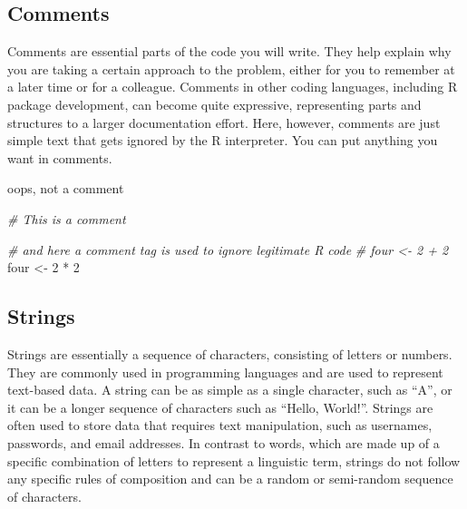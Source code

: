 \documentclass[
]{book}
\newenvironment{Shaded}{\begin{snugshade}}{\end{snugshade}}
\newcommand{\CommentTok}[1]{\textcolor[rgb]{0.56,0.35,0.01}{\textit{#1}}}
\newcommand{\DecValTok}[1]{\textcolor[rgb]{0.00,0.00,0.81}{#1}}
\newcommand{\NormalTok}[1]{#1}
\newcommand{\OtherTok}[1]{\textcolor[rgb]{0.56,0.35,0.01}{#1}}
\newcommand{\SpecialCharTok}[1]{\textcolor[rgb]{0.00,0.00,0.00}{#1}}
\begin{document}
\hypertarget{comments}{%
\subsection{Comments}\label{comments}}

Comments are essential parts of the code you will write. They help explain why you are taking a certain approach to the problem, either for you to remember at a later time or for a colleague. Comments in other coding languages, including R package development, can become quite expressive, representing parts and structures to a larger documentation effort. Here, however, comments are just simple text that gets ignored by the R interpreter. You can put anything you want in comments.

\begin{Shaded}
\begin{Highlighting}[]
\NormalTok{oops, not a comment}
\end{Highlighting}
\end{Shaded}

\begin{Shaded}
\begin{Highlighting}[]
\CommentTok{\# This is a comment}

\CommentTok{\# and here a comment tag is used to ignore legitimate R code}
\CommentTok{\# four \textless{}{-} 2 + 2 }
\NormalTok{four }\OtherTok{\textless{}{-}} \DecValTok{2} \SpecialCharTok{*} \DecValTok{2}
\end{Highlighting}
\end{Shaded}

\hypertarget{strings}{%
\subsection{Strings}\label{strings}}

Strings are essentially a sequence of characters, consisting of letters or numbers. They are commonly used in programming languages and are used to represent text-based data. A string can be as simple as a single character, such as ``A'', or it can be a longer sequence of characters such as ``Hello, World!''. Strings are often used to store data that requires text manipulation, such as usernames, passwords, and email addresses. In contrast to words, which are made up of a specific combination of letters to represent a linguistic term, strings do not follow any specific rules of composition and can be a random or semi-random sequence of characters.
\end{document}
